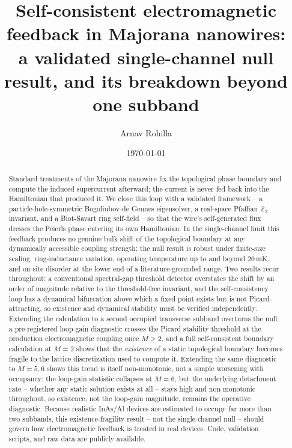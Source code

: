 \documentclass[aps,physrev,reprint,superscriptaddress,amsmath,amssymb,floatfix]{revtex4-2}
\begin{document}
\title{Self-consistent electromagnetic feedback in Majorana nanowires:\\
a validated single-channel null result, and its breakdown beyond one subband}

\author{Arnav Rohilla}

\date{\today}

\begin{abstract}
Standard treatments of the Majorana nanowire fix the topological phase
boundary and compute the induced supercurrent afterward; the current is
never fed back into the Hamiltonian that produced it. We close this loop
with a validated framework -- a particle-hole-symmetric Bogoliubov-de
Gennes eigensolver, a real-space Pfaffian $\mathbb{Z}_2$ invariant, and a
Biot-Savart ring self-field -- so that the wire's self-generated flux
dresses the Peierls phase entering its own Hamiltonian. In the
single-channel limit this feedback produces no genuine bulk shift of the
topological boundary at any dynamically accessible coupling strength; the
null result is robust under finite-size scaling, ring-inductance
variation, operating temperature up to and beyond $20\,\mathrm{mK}$, and
on-site disorder at the lower end of a literature-grounded range. Two
results recur throughout: a conventional spectral-gap threshold detector
overstates the shift by an order of magnitude relative to the
threshold-free invariant, and the self-consistency loop has a dynamical
bifurcation above which a fixed point exists but is not
Picard-attracting, so existence and dynamical stability must be verified
independently. Extending the calculation to a second occupied transverse
subband overturns the null: a pre-registered loop-gain diagnostic crosses
the Picard stability threshold at the production electromagnetic
coupling once $M\geq2$, and a full self-consistent boundary calculation
at $M=2$ shows that the \emph{existence} of a static topological boundary
becomes fragile to the lattice discretization used to compute it.
Extending the same diagnostic to $M=5,6$ shows this trend is itself
non-monotonic, not a simple worsening with occupancy: the loop-gain
statistic collapses at $M=6$, but the underlying detachment rate --
whether any static solution exists at all -- stays high and
non-monotonic throughout, so existence, not the loop-gain magnitude,
remains the operative diagnostic. Because realistic InAs/Al devices are
estimated to occupy far more than two subbands, this existence-fragility
result -- not the single-channel null -- should govern how
electromagnetic feedback is treated in real devices. Code, validation
scripts, and raw data are publicly available.
\end{abstract}
\end{document}
